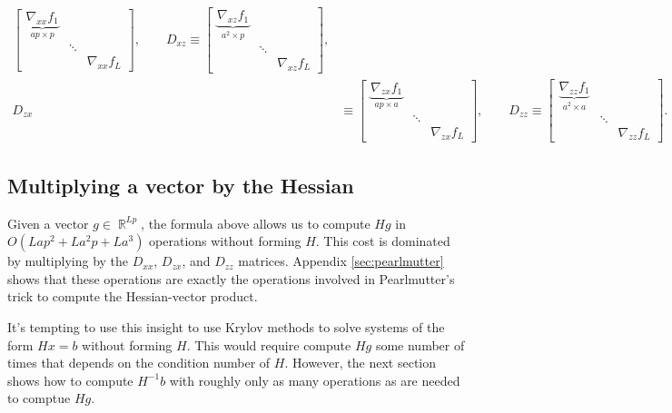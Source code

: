 \documentclass{article}
\newcommand{\R}{\mathop{\mathbb{R}}}
\begin{document}
\begin{align*}
  \begin{bmatrix}
    \underbrace{\nabla_{xx} f_1}_{ap\times p} &        &                 \\
    & \ddots &                 \\
    &        & \nabla_{xx} f_L
  \end{bmatrix}
  , \qquad
  D_{xz} \equiv
  \begin{bmatrix}
    \underbrace{\nabla_{xz} f_1}_{a^2 \times p} &        &                 \\
    & \ddots &                 \\
    &        & \nabla_{xz} f_L
  \end{bmatrix}
  ,                                                                                                \\
  D_{zx} & \equiv
  \begin{bmatrix}
    \underbrace{\nabla_{zx} f_1}_{ap \times a} &        &                 \\
    & \ddots &                 \\
    &        & \nabla_{zx} f_L
  \end{bmatrix}
  ,
  \qquad
  D_{zz}  \equiv
  \begin{bmatrix}
    \underbrace{\nabla_{zz} f_1}_{a^2\times a} &        &                 \\
    & \ddots &                 \\
    &        & \nabla_{zz} f_L
  \end{bmatrix}
  .
\end{align*}
\subsection{Multiplying a vector by the Hessian}


Given a vector $g \in \R^{Lp}$, the formula above allows us to compute $H g$ in $O\left(Lap^2 + L a^2p +La^3\right)$
operations without forming $H$. This cost is dominated by multiplying by the $D_{xx}$, $D_{zx}$, and $D_{zz}$ matrices.
Appendix \ref{sec:pearlmutter} shows that these operations are exactly the operations involved in Pearlmutter's trick
to compute the Hessian-vector product.

It's tempting to use this insight to use Krylov methods to solve systems of the form $H x = b$ without forming $H$.
This would require compute $H g$ some number of times that depends on the condition number of $H$. However, the next
section shows how to compute $H^{-1} b$ with roughly only as many operations as are needed to comptue $H g$.
\end{document}
